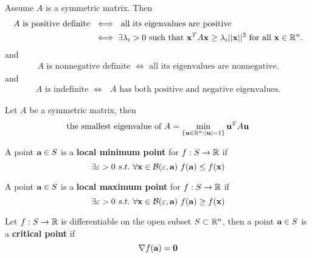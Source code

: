 \documentclass[11pt]{article}
\begin{document}
			\begin{theorem}
				Assume $A$ is a symmetric matrix. Then
				\begin{align}
					A\mbox{ is positive definite }
					&\iff \mbox{ all its eigenvalues are positive }\nonumber \\
					&\iff \exists\lambda_i>0\mbox{ such that }\textbf{x}^T A\textbf{x} \geq \lambda_i \vert \vert {\textbf{x}} \vert \vert^2 \mbox{ for all }\textbf{x}\in \mathbb{R}^n.\nonumber
				\end{align}
				and
				\begin{align}
					A\mbox{ is nonnegative definite } \iff \mbox{ all its eigenvalues are nonnegative.}
				\end{align}
				and 
				\begin{align}
					A\mbox{ is indefinite } \iff \mbox{ $A$ has both positive and negative eigenvalues.}
				\end{align}
			\end{theorem}
			
			\begin{lemma}
				Let $A$ be a symmetric matrix, then
				\begin{equation}
					\mbox{the smallest eigenvalue of }A = \min_{\{\textbf{u}\in \mathbb{R}^n : |\textbf{u}|=1\} } \textbf{u}^T A\textbf{u}
				\end{equation}
			\end{lemma}
			
			\begin{definition}
				A point $\textbf{a} \in S$ is a \textbf{local minimum point} for $f: S \to \mathbb{R}$ if 
				\begin{equation}
					\exists \varepsilon > 0\ s.t.\ \forall \textbf{x} \in \mathcal{{B}}(\varepsilon, \textbf{a})\ f(\textbf{a}) \leq f(\textbf{x})
				\end{equation}
			\end{definition}
			
			\begin{definition}
				A point $\textbf{a} \in S$ is a \textbf{local maximum point} for $f: S \to \mathbb{R}$ if 
				\begin{equation}
					\exists \varepsilon > 0\ s.t.\ \forall \textbf{x} \in \mathcal{{B}}(\varepsilon, \textbf{a})\ f(\textbf{a}) \geq f(\textbf{x})
				\end{equation}
			\end{definition}
			
			\begin{definition}
				Let $f: S \to \mathbb{R}$ is differentiable on the open subset $S \subset \mathbb{R}^n$, then a point $\textbf{a} \in S$ is a \textbf{critical point} if 
				\begin{equation}
					\nabla f(\textbf{a}) = \textbf{0}
				\end{equation}
			\end{definition}
			
\end{document}
